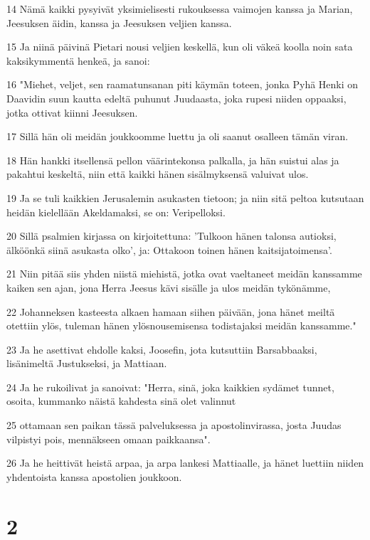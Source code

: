 \par 14 Nämä kaikki pysyivät yksimielisesti rukouksessa vaimojen kanssa ja Marian, Jeesuksen äidin, kanssa ja Jeesuksen veljien kanssa.
\par 15 Ja niinä päivinä Pietari nousi veljien keskellä, kun oli väkeä koolla noin sata kaksikymmentä henkeä, ja sanoi:
\par 16 "Miehet, veljet, sen raamatunsanan piti käymän toteen, jonka Pyhä Henki on Daavidin suun kautta edeltä puhunut Juudaasta, joka rupesi niiden oppaaksi, jotka ottivat kiinni Jeesuksen.
\par 17 Sillä hän oli meidän joukkoomme luettu ja oli saanut osalleen tämän viran.
\par 18 Hän hankki itsellensä pellon väärintekonsa palkalla, ja hän suistui alas ja pakahtui keskeltä, niin että kaikki hänen sisälmyksensä valuivat ulos.
\par 19 Ja se tuli kaikkien Jerusalemin asukasten tietoon; ja niin sitä peltoa kutsutaan heidän kielellään Akeldamaksi, se on: Veripelloksi.
\par 20 Sillä psalmien kirjassa on kirjoitettuna: 'Tulkoon hänen talonsa autioksi, älköönkä siinä asukasta olko', ja: Ottakoon toinen hänen kaitsijatoimensa'.
\par 21 Niin pitää siis yhden niistä miehistä, jotka ovat vaeltaneet meidän kanssamme kaiken sen ajan, jona Herra Jeesus kävi sisälle ja ulos meidän tykönämme,
\par 22 Johanneksen kasteesta alkaen hamaan siihen päivään, jona hänet meiltä otettiin ylös, tuleman hänen ylösnousemisensa todistajaksi meidän kanssamme."
\par 23 Ja he asettivat ehdolle kaksi, Joosefin, jota kutsuttiin Barsabbaaksi, lisänimeltä Justukseksi, ja Mattiaan.
\par 24 Ja he rukoilivat ja sanoivat: "Herra, sinä, joka kaikkien sydämet tunnet, osoita, kummanko näistä kahdesta sinä olet valinnut
\par 25 ottamaan sen paikan tässä palveluksessa ja apostolinvirassa, josta Juudas vilpistyi pois, mennäkseen omaan paikkaansa".
\par 26 Ja he heittivät heistä arpaa, ja arpa lankesi Mattiaalle, ja hänet luettiin niiden yhdentoista kanssa apostolien joukkoon.

\chapter{2}


